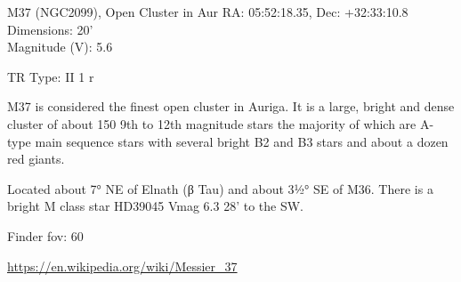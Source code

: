 \begin{block}{M37 (NGC2099), Open Cluster in Aur}
    RA: 05:52:18.35, Dec: +32:33:10.8 \\ 
    Dimensions: 20' \\ 
    Magnitude (V): 5.6

    TR Type: II 1 r

    M37 is considered the finest open cluster in Auriga. It is a large, bright
    and dense cluster of about 150 9th to 12th magnitude stars the majority of
    which are A-type main sequence stars with several bright B2 and B3 stars
    and about a dozen red giants.

    Located about 7° NE of Elnath (β Tau) and about 3½° SE of M36. There is a
    bright M class star HD39045 Vmag 6.3 28' to the SW.


    Finder fov: 60 

    \url{https://en.wikipedia.org/wiki/Messier_37} 
\end{block}
